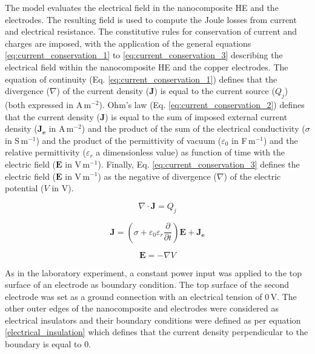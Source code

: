 The model evaluates the electrical field in the nanocomposite HE and the electrodes. 
The resulting field is used to compute the Joule losses from current and electrical resistance. 
The constitutive rules for conservation of current and charges are imposed, with the application of the general equations \ref{eq:current_conservation_1} to \ref{eq:current_conservation_3} describing the electrical field within the nanocomposite HE and the copper electrodes. 
The equation of continuity (Eq. \ref{eq:current_conservation_1}) defines that the divergence ($\nabla$) of the current density ($\mathbf{J}$) is equal to the current source ($Q_j$) (both expressed in \mbox{A\,m$^{-2}$}). 
Ohm’s law (Eq. \ref{eq:current_conservation_2}) defines that the current density ($\mathbf{J}$) is equal to the sum of imposed external current density ($\mathbf{J_e}$ in \mbox{A\,m$^{-2}$}) and the product of the sum of the electrical conductivity ($\sigma$ in \mbox{S\,m$^{-1}$}) and the product of the permittivity of vacuum ($\varepsilon_0$ in \mbox{F\,m$^{-1}$}) and the relative permittivity ($\varepsilon_r$ a dimensionless value) as function of time with the electric field ($\mathbf{E}$ in \mbox{V\,m$^{-1}$}). 
Finally, Eq. \ref{eq:current_conservation_3} defines the electric field ($\mathbf{E}$ in \mbox{V\,m$^{-1}$}) as the negative of divergence ($\nabla$) of the electric potential ($V$ in V). 

\begin{equation}
\nabla \cdot \mathbf{J} = Q_j
\label{eq:current_conservation_1}
\end{equation}

\begin{equation}
\mathbf{J} = \left( \sigma + \varepsilon_0 \varepsilon_r \frac{\partial}{\partial t} \right) \mathbf{E} + \mathbf{J_e}
\label{eq:current_conservation_2}
\end{equation}

\begin{equation}
\mathbf{E} = - \nabla V
\label{eq:current_conservation_3}
\end{equation}

As in the laboratory experiment, a constant power input was applied to the top surface of an electrode as boundary condition. 
The top surface of the second electrode was set as a ground connection with an electrical tension of 0\,V. 
The other outer edges of the nanocomposite and electrodes were considered as electrical insulators and their boundary conditions were defined as per equation \ref{electrical_insulation} which defines that the current density perpendicular to the boundary is equal to 0. 

